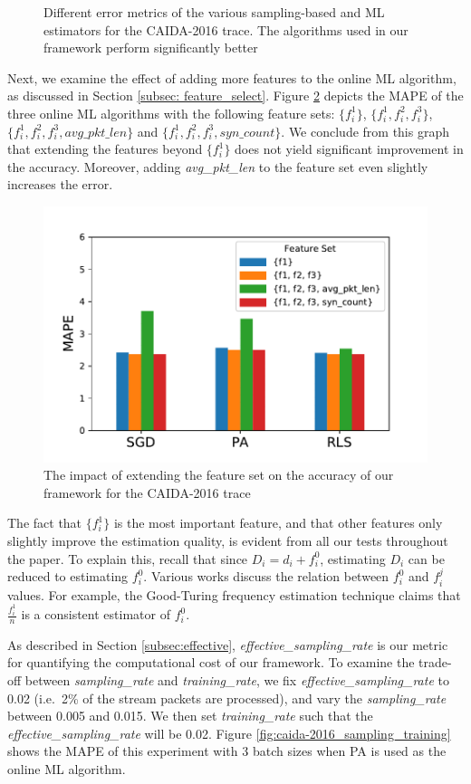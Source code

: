 		\begin{figure}
			\centering
			\small
			
			\caption{Different error metrics of the various sampling-based and ML estimators for the CAIDA-2016 trace. The algorithms used in our framework perform significantly better}
			\label{fig:caida-2016_error}
		\end{figure}
		
		Next, we examine the effect of adding more features to the online ML algorithm, as discussed in Section \ref{subsec: feature_select}. Figure \ref{fig:caida-2016_features} depicts the MAPE of the three online ML algorithms with the following feature sets: $\{f_i^1\}$, $\{f_i^1, f_i^2, f_i^3\}$,  $\{f_i^1, f_i^2, f_i^3, avg\_pkt\_len\}$ and $\{f_i^1, f_i^2, f_i^3, syn\_count\}$. We conclude from this graph that extending the features beyond $\{f_i^1\}$ does not yield significant improvement in the accuracy. Moreover, adding \emph{avg\_pkt\_len} to the feature set even slightly increases the error. 
		
		\begin{figure}[!tb]
			\centering
			\includegraphics[width=.49\textwidth]{img/caida-2016_features.pdf}
			\caption{The impact of extending the feature set on the accuracy of our framework for the CAIDA-2016 trace}
			\label{fig:caida-2016_features}
		\end{figure}

The fact that $\{f_i^1\}$ is the most important feature, and that other features
only slightly improve the estimation quality, is evident from all our tests
throughout the paper. To explain this, recall that 
since $D_i=d_i+f_i^0$,  estimating
$D_i$ can be reduced to estimating $f_i^0$.
Various works discuss
the relation between $f_i^0$ and $f_i^j$ values. For
example, the Good-Turing frequency estimation technique
\cite{good1953population} claims that $\frac{f_i^1}{n}$
is a consistent estimator of $f_i^0$.
		
As described in Section \ref{subsec:effective},
\emph{effective\_sampling\_rate} is our metric
for quantifying the computational cost of our
framework. To examine the trade-off between
\emph{sampling\_rate} and \emph{training\_rate},
we fix \emph{effective\_sampling\_rate} to 0.02
(i.e.\, 2\% of the stream packets are processed),
and vary the \emph{sampling\_rate} between 0.005 and
0.015. We then set \emph{training\_rate} such that the
\emph{effective\_sampling\_rate} will be 0.02. Figure
\ref{fig:caida-2016_sampling_training} shows the MAPE
of this experiment with 3 batch sizes when PA is used
as the online ML algorithm.

